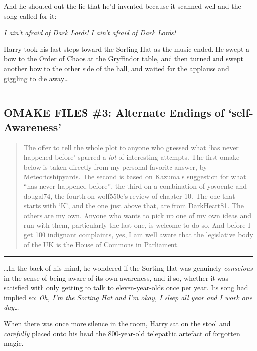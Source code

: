 And he shouted out the lie that he'd invented because it scanned well
and the song called for it:

\emph{I ain't afraid of Dark Lords!} \emph{I ain't afraid of Dark
Lords!}

Harry took his last steps toward the Sorting Hat as the music ended. He
swept a bow to the Order of Chaos at the Gryffindor table, and then
turned and swept another bow to the other side of the hall, and waited
for the applause and giggling to die away\ldots{}

\begin{center}\rule{3in}{0.4pt}\end{center}

\subsection{OMAKE FILES \#3: Alternate Endings of
`self-Awareness'}\label{omake-files-3-alternate-endings-of-self-awareness}

\begin{quote}
The offer to tell the whole plot to anyone who guessed what `has never
happened before' spurred a \emph{lot} of interesting attempts. The first
omake below is taken directly from my personal favorite answer, by
Meteoricshipyards. The second is based on Kazuma's suggestion for what
``has never happened before'', the third on a combination of yoyoente
and dougal74, the fourth on wolf550e's review of chapter 10. The one
that starts with `K', and the one just above that, are from DarkHeart81.
The others are my own. Anyone who wants to pick up one of my own ideas
and run with them, particularly the last one, is welcome to do so. And
before I get 100 indignant complaints, yes, I am well aware that the
legislative body of the UK is the House of Commons in Parliament.
\end{quote}

\begin{center}\rule{3in}{0.4pt}\end{center}

\ldots{}In the back of his mind, he wondered if the Sorting Hat was
genuinely \emph{conscious} in the sense of being aware of its own
awareness, and if so, whether it was satisfied with only getting to talk
to eleven-year-olds once per year. Its song had implied so: \emph{Oh,
I'm the Sorting Hat and I'm okay, I sleep all year and I work one
day\ldots{}}

When there was once more silence in the room, Harry sat on the stool and
\emph{carefully} placed onto his head the 800-year-old telepathic
artefact of forgotten magic.

